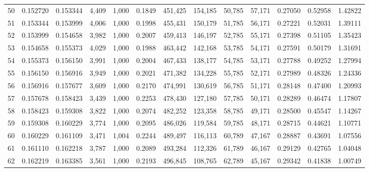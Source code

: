 \begin{tabular}{rrrrrrrrrrrrr}
50  &  0.152720 &  0.153344 &   4,409 &  1,000 &                                     0.1849 &  451,425 &  154,185 &   50,785 &   57,171 &  0.27050 &  0.52958 &  1.42822 \\
51  &  0.153344 &  0.153999 &   4,006 &  1,000 &                                     0.1998 &  455,431 &  150,179 &   51,785 &   56,171 &  0.27221 &  0.52031 &  1.39111 \\
52  &  0.153999 &  0.154658 &   3,982 &  1,000 &                                     0.2007 &  459,413 &  146,197 &   52,785 &   55,171 &  0.27398 &  0.51105 &  1.35423 \\
53  &  0.154658 &  0.155373 &   4,029 &  1,000 &                                     0.1988 &  463,442 &  142,168 &   53,785 &   54,171 &  0.27591 &  0.50179 &  1.31691 \\
54  &  0.155373 &  0.156150 &   3,991 &  1,000 &                                     0.2004 &  467,433 &  138,177 &   54,785 &   53,171 &  0.27788 &  0.49252 &  1.27994 \\
55  &  0.156150 &  0.156916 &   3,949 &  1,000 &                                     0.2021 &  471,382 &  134,228 &   55,785 &   52,171 &  0.27989 &  0.48326 &  1.24336 \\
56  &  0.156916 &  0.157677 &   3,609 &  1,000 &                                     0.2170 &  474,991 &  130,619 &   56,785 &   51,171 &  0.28148 &  0.47400 &  1.20993 \\
57  &  0.157678 &  0.158423 &   3,439 &  1,000 &                                     0.2253 &  478,430 &  127,180 &   57,785 &   50,171 &  0.28289 &  0.46474 &  1.17807 \\
58  &  0.158423 &  0.159308 &   3,822 &  1,000 &                                     0.2074 &  482,252 &  123,358 &   58,785 &   49,171 &  0.28500 &  0.45547 &  1.14267 \\
59  &  0.159308 &  0.160229 &   3,774 &  1,000 &                                     0.2095 &  486,026 &  119,584 &   59,785 &   48,171 &  0.28715 &  0.44621 &  1.10771 \\
60  &  0.160229 &  0.161109 &   3,471 &  1,004 &                                     0.2244 &  489,497 &  116,113 &   60,789 &   47,167 &  0.28887 &  0.43691 &  1.07556 \\
61  &  0.161110 &  0.162218 &   3,787 &  1,000 &                                     0.2089 &  493,284 &  112,326 &   61,789 &   46,167 &  0.29129 &  0.42765 &  1.04048 \\
62  &  0.162219 &  0.163385 &   3,561 &  1,000 &                                     0.2193 &  496,845 &  108,765 &   62,789 &   45,167 &  0.29342 &  0.41838 &  1.00749 \\

\end{tabular}
